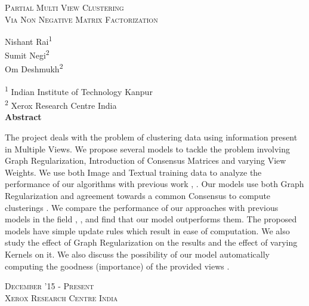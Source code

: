 \documentclass[a4paper]{article}
\begin{document}
	\begin{titlepage}
	    \begin{center}
	        \vspace*{1cm}
	        
	       	\huge{\textsc{Partial Multi View Clustering}}\\
			\Large{\textsc{Via Non Negative Matrix Factorization}}	

	        \vspace{8mm}
	        \large{Nishant Rai\textsuperscript{1}}\\
			\large{Sumit Negi\textsuperscript{2}}\\
			\large{Om Deshmukh\textsuperscript{2}}\\
			\vspace{3mm}
			
			{\normalsize{\textsuperscript{1} Indian Institute of Technology Kanpur\\}}
			{\normalsize{\textsuperscript{2} Xerox Research Centre India\\}}
	        \vspace{4mm}
        	\vspace{7mm}
	        \textbf{Abstract\\}
        	\vspace{4mm}
        	\noindent
{\justifying\small{The project deals with the problem of clustering data using information present in Multiple Views. We propose several models to tackle the problem involving Graph Regularization, Introduction of Consensus Matrices and varying View Weights. We use both Image and Textual training data \cite{greene2009matrix} to analyze the performance of our algorithms with previous work \cite{pvc15}, \cite{nmfsdm}. Our models use both Graph Regularization \cite{GReg} and agreement towards a common Consensus to compute clusterings \cite{nmfsdm}. We compare the performance of our approaches with previous models in the field \cite{pvc15}, \cite{nmfsdm}, \cite{GReg} and find that our model outperforms them. The proposed models have simple update rules which result in ease of computation. We also study the effect of Graph Regularization on the results and the effect of varying Kernels on it. We also discuss the possibility of our model automatically computing the goodness (importance) of the provided views \cite{cai2013multi}.} \par}
			\vfill
            \vspace{3mm}
            \large\textsc{December '15 - Present\\}
            \vspace{1mm}
            \large\textsc{Xerox Research Centre India}
	    \end{center}
	\end{titlepage}
	\restoregeometry
\end{document}
